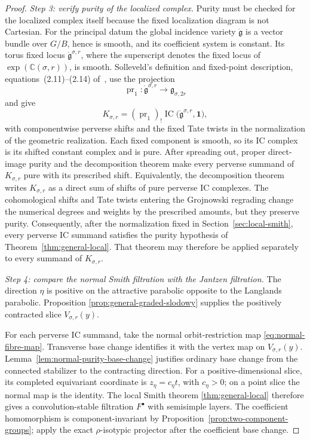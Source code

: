 \documentclass[10pt,a4paper]{amsart}
\newcommand{\IC}{\operatorname{IC}}
\begin{document}
\begin{proof}
\smallskip
\noindent\emph{Step 3: verify purity of the localized complex.}
Purity must be checked for the localized complex itself because the fixed
localization diagram is not Cartesian.  For the principal datum the global
incidence variety $\dot{\mathfrak g}$ is a vector bundle over $G/B$, hence is
smooth, and its coefficient system is constant.  Its torus fixed locus
$\dot{\mathfrak g}^{\sigma,r}$, where the superscript denotes the fixed locus
of $\exp(\mathbb C(\sigma,r))$, is smooth.  Solleveld's definition and
fixed-point description, equations~(2.11)--(2.14) of~\cite{Solleveld}, use
the projection
\[
 \operatorname{pr}_1:\dot{\mathfrak g}^{\sigma,r}
 \longrightarrow\mathfrak g_{\sigma,2r}
\]
and give
\[
 K_{\sigma,r}=(\operatorname{pr}_1)_!
 \IC\bigl(\dot{\mathfrak g}^{\sigma,r},\mathbf1\bigr),
\]
with componentwise perverse shifts and the fixed Tate twists in the
normalization of the geometric realization.  Each fixed component is smooth,
so its IC
complex is its shifted constant complex and is pure.  After spreading out,
proper direct-image purity and the decomposition theorem
\cite[Stabilit\'es~5.1.14 and Th\'eor\`eme~5.4.5]{BBD} make every perverse summand of
$K_{\sigma,r}$ pure
with its prescribed shift.  Equivalently, the decomposition theorem writes
$K_{\sigma,r}$ as a direct sum of shifts of pure perverse IC complexes.
The cohomological shifts and Tate twists entering the Grojnowski regrading
change the numerical degrees and weights by the prescribed amounts, but they
preserve purity.  Consequently, after the normalization fixed in
Section~\ref{sec:local-smith}, every perverse IC summand satisfies the purity
hypothesis of Theorem~\ref{thm:general-local}.  That theorem may therefore be
applied separately to every summand of $K_{\sigma,r}$.

\smallskip
\noindent\emph{Step 4: compare the normal Smith filtration with the
Jantzen filtration.}
The direction $\eta$ is positive on the attractive parabolic opposite
to the Langlands parabolic.  Proposition
\ref{prop:general-graded-slodowy} supplies the positively contracted
slice $V_{\sigma,r}(y)$.

For each perverse IC summand, take the normal orbit-restriction map
\eqref{eq:normal-fibre-map}.  Transverse base change identifies it with
the vertex map on $V_{\sigma,r}(y)$.
Lemma~\ref{lem:normal-purity-base-change} justifies ordinary base change
from the connected stabilizer to the contracting direction.  For a
positive-dimensional slice, its completed equivariant coordinate is
$z_\eta=c_\eta t$, with $c_\eta>0$; on a point slice the normal map is
the identity.  The local Smith theorem
\ref{thm:general-local} therefore gives a convolution-stable filtration
$F^\bullet$ with semisimple layers.
The coefficient homomorphism is component-invariant by
Proposition~\ref{prop:two-component-groups}; apply the exact
$\rho$-isotypic projector after the coefficient base change.


\end{proof}
\end{document}
